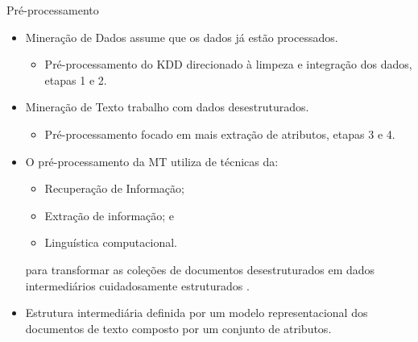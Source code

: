 \documentclass[%
  10pt,%
  aspectratio = 169,%
  compress,%
  t,%
]{beamer}%
\begin{document}
    \begin{frame}[fragile = singleslide]{}{Pré-processamento}
        \begin{itemize}
            \item Mineração de Dados assume que os dados já estão processados.
            \begin{itemize}
                \item Pré-processamento do KDD direcionado à limpeza e integração dos dados, etapas 1 e 2.
            \end{itemize}
            
            \item Mineração de Texto trabalho com dados desestruturados.
                \begin{itemize}
                    \item Pré-processamento focado em mais extração de atributos, etapas 3 e 4.
                \end{itemize}
        
            \item O pré-processamento da MT utiliza de técnicas da:
            \begin{itemize}
                \item Recuperação de Informação;
                \item Extração de informação; e
                \item Linguística computacional.
            \end{itemize}
            para transformar as coleções de documentos desestruturados em dados intermediários cuidadosamente estruturados \cite[p.~2--3]{Feldman:2006:TMH:1076381}.
        
            \item Estrutura intermediária definida por um modelo representacional dos documentos de texto composto por um conjunto de atributos.
        \end{itemize}
    \end{frame}
    
\end{document}
